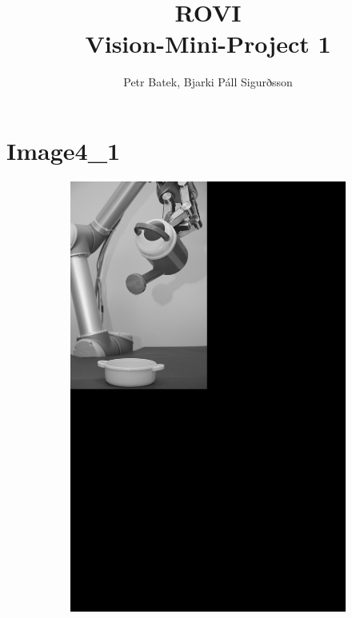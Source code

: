 \documentclass[11pt]{article}
\title{ROVI\\ Vision-Mini-Project 1}
\author{Petr Batek, Bjarki Páll Sigurðsson}
\numberwithin{equation}{section}
\begin{document}

\maketitle

\newpage

\section{Image4\_1}

\begin{figure}[h]
	\vspace{-3cm}
	\centering
	\begin{subfigure}[b]{0.3\textwidth}
		\includegraphics[width=\textwidth]{fig/padded4_1.png}

\end{subfigure}
\end{figure}
\end{document}
